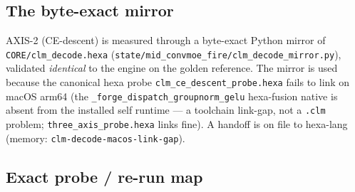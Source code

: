 \subsection{The byte-exact mirror}
\label{app:repro-mirror}

AXIS-2 (CE-descent) is measured through a byte-exact Python mirror of
\texttt{CORE/clm\_decode.hexa}
(\texttt{state/mid\_convmoe\_fire/clm\_decode\_mirror.py}), validated
\emph{identical} to the engine on the golden reference. The mirror is used because
the canonical hexa probe \texttt{clm\_ce\_descent\_probe.hexa} fails to link on
macOS arm64 (the \texttt{\_forge\_dispatch\_groupnorm\_gelu} hexa-fusion native is
absent from the installed self runtime --- a toolchain link-gap, not a \texttt{.clm}
problem; \texttt{three\_axis\_probe.hexa} links fine). A handoff is on file to
hexa-lang (memory: \texttt{clm-decode-macos-link-gap}).

\subsection{Exact probe / re-run map}
\label{app:repro-commands}

